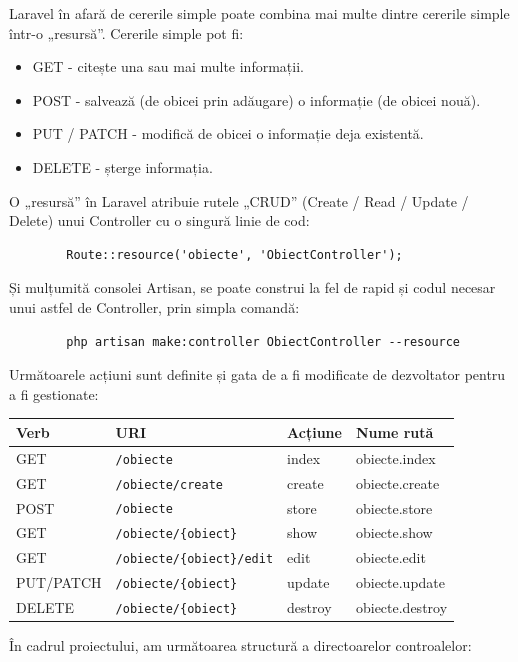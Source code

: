 	Laravel în afară de cererile simple poate combina mai multe dintre cererile simple într-o „resursă”.
	Cererile simple pot fi:
	\begin{itemize}
		\item GET - citește una sau mai multe informații.
		\item POST - salvează (de obicei prin adăugare) o informație (de obicei nouă).
		\item PUT / PATCH - modifică de obicei o informație deja existentă.
		\item DELETE - șterge informația.
	\end{itemize}

	O „resursă” în Laravel atribuie rutele „CRUD” (Create / Read / Update / Delete) unui Controller cu o singură linie de cod:
	\begin{verbatim}
		Route::resource('obiecte', 'ObiectController');
	\end{verbatim}
	Și mulțumită consolei Artisan, se poate construi la fel de rapid și codul necesar unui astfel de Controller, prin simpla comandă:
	\begin{verbatim}
		php artisan make:controller ObiectController --resource
	\end{verbatim}

	Următoarele acțiuni sunt definite și gata de a fi modificate de dezvoltator pentru a fi gestionate:
	\begin{center}
	\begin{tabular}{ | l | l | l | l |}
	\hline
	Verb & URI & Acțiune & Nume rută \\
	\hline
	GET & \verb|/obiecte| & index & obiecte.index \\
	GET & \verb|/obiecte/create| & create & obiecte.create \\
	POST & \verb|/obiecte| & store & obiecte.store \\
	GET & \verb|/obiecte/{obiect}| & show & obiecte.show \\
	GET & 	\verb|/obiecte/{obiect}/edit| & edit & obiecte.edit \\
	PUT/PATCH & \verb|/obiecte/{obiect}| & update & obiecte.update \\
	DELETE & \verb|/obiecte/{obiect}| & destroy & obiecte.destroy \\
	\hline
	\end{tabular}
	\end{center}

	În cadrul proiectului, am următoarea structură a directoarelor controalelor:

